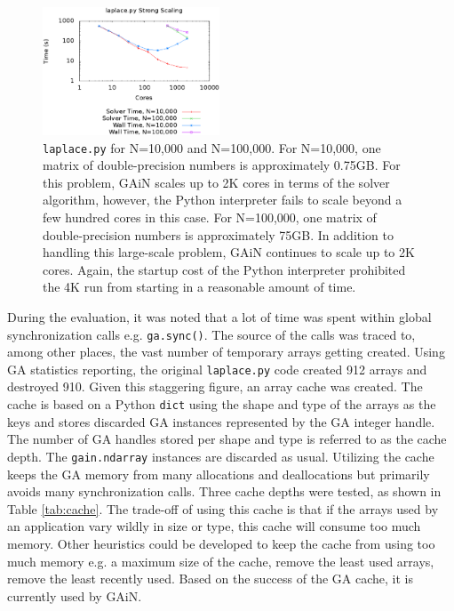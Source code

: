 \documentclass{sigplanconf}
\begin{document}
\begin{figure}[htb]
\centering
\includegraphics[width=0.47\textwidth]{laplace.eps}
\caption{
\texttt{laplace.py} for N=10,000 and N=100,000. For N=10,000, one matrix
of double-precision numbers is approximately 0.75GB. For this problem, GAiN
scales up to 2K cores in terms of the solver algorithm, however, the Python
interpreter fails to scale beyond a few hundred cores in this case. For
N=100,000, one matrix of double-precision numbers is approximately 75GB. In
addition to handling this large-scale problem, GAiN continues to scale up to
2K cores. Again, the startup cost of the Python interpreter prohibited the 4K
run from starting in a reasonable amount of time.
}
\label{fig:laplace}
\end{figure}

During the evaluation, it was noted that a lot of time was spent within global
synchronization calls e.g. \verb=ga.sync()=. The source of the calls was
traced to, among other places, the vast number of temporary arrays getting
created.  Using GA statistics reporting, the original \verb=laplace.py= code
created 912 arrays and destroyed 910. Given this staggering figure, an array
cache was created. The cache is based on a Python \verb=dict= using the shape
and type of the arrays as the keys and stores discarded GA instances
represented by the GA integer handle. The number of GA handles stored per
shape and type is referred to as the cache depth. The \verb=gain.ndarray=
instances are discarded as usual.  Utilizing the cache keeps the GA memory
from many allocations and deallocations but primarily avoids many
synchronization calls. Three cache depths were tested, as shown in Table
\ref{tab:cache}. The trade-off of using this cache is that if the arrays used
by an application vary wildly in size or type, this cache will consume too
much memory. Other heuristics could be developed to keep the cache from using
too much memory e.g. a maximum size of the cache, remove the least used
arrays, remove the least recently used.  Based on the success of the GA cache,
it is currently used by GAiN.
\end{document}
